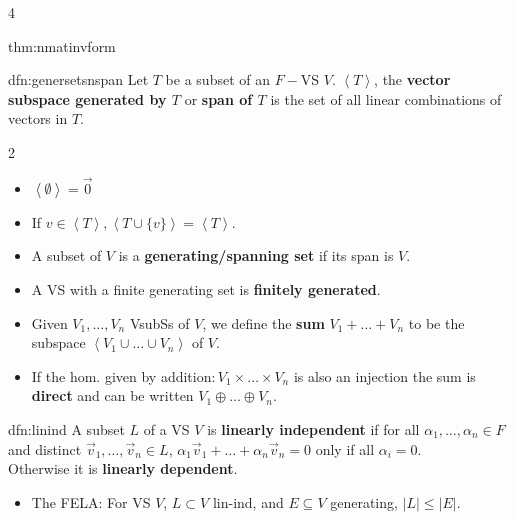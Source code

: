 \documentclass[landscape, 8pt]{extarticle}
\begin{document}
\begin{multicols*}{4}
\begin{thm}{thm:nmatinvform}{ }
		\end{thm}
		
		
		\begin{dfn}{dfn:genersetsnspan}{ }
			Let $T$ be a subset of an $F-$VS $V$. $\left\langle T\right\rangle$, the \textbf{vector subspace generated by $T$} or \textbf{span of $T$} is the set of all linear combinations of vectors in $T$. 
			\vspace{-5.5ex}
			{\setlength{\columnsep}{-8em}
			\begin{multicols*}{2}
			\begin{itemize}
				\item $\left\langle \emptyset\right\rangle = \vec{0}$
				\item If $v \in \left\langle T\right\rangle, \left\langle T \cup \{v\}\right\rangle = \left\langle T\right\rangle$.
			\end{itemize}
			\end{multicols*}
			}
			\vspace{-5.5ex}
			\begin{itemize}
				\item A subset of $V$ is a \textbf{generating/spanning set} if its span is $V$. 
				\item A VS with a finite generating set is \textbf{finitely generated}.
				\item Given $V_1, \dots, V_n$ VsubSs of $V$, we define the \textbf{sum} $V_1 + \dots + V_n$ to be the subspace $\left\langle V_1 \cup \dots \cup V_n\right\rangle$ of $V$. 
				\item If the hom. given by addition$: V_1 \times \dots \times V_n$ is also an injection the sum is \textbf{direct} and can be written $V_1 \oplus \dots \oplus V_n$.
			\end{itemize}
			
		\end{dfn}
		
		
		\begin{dfn}{dfn:linind}{ }
			A subset $L$ of a VS $V$ is \textbf{linearly independent} if for all $\alpha_1, \dots, \alpha_n \in F$ and distinct $\vec{v}_1, \dots, \vec{v}_n \in L$, $\alpha_1 \vec{v}_1 + \dots + \alpha_n \vec{v}_n = 0$ only if all $\alpha_i = 0$.\\
			Otherwise it is \textbf{linearly dependent}.
			\begin{itemize}
				\item The FELA: For VS $V$, $L \subset V$ lin-ind, and $E \subseteq V$ generating, $\left|L\right| \le \left|E\right|$.
			\end{itemize}
			

\end{dfn}
\end{multicols*}
\end{document}
